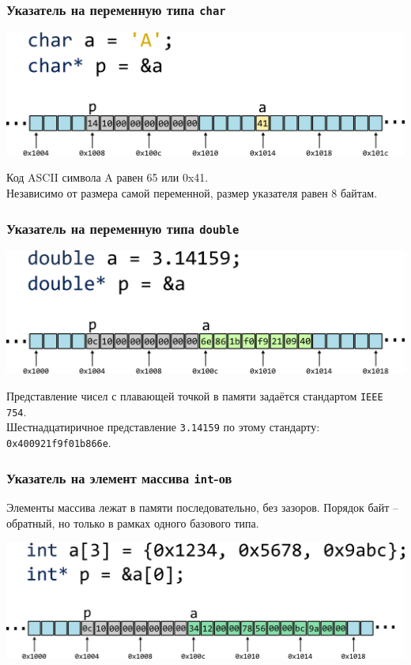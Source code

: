 \documentclass[10pt,pdf,hyperref={unicode}]{beamer}
\begin{document}
\begin{frame}[fragile]
\frametitle{Указатель на переменную типа \texttt{char}} 
\begin{center}
\includegraphics[width=0.86\linewidth]{../images/memory/memory_4_pointer_to_char.png}
\end{center}
Код ASCII символа A равен 65 или 0x41. \\
Независимо от размера самой переменной, размер указателя равен 8 байтам.
\end{frame}

\begin{frame}[fragile]
\frametitle{Указатель на переменную типа \texttt{double}} 
\begin{center}
\includegraphics[width=0.86\linewidth]{../images/memory/memory_5_pointer_to_double.png}
\end{center}
Представление чисел с плавающей точкой в памяти задаётся стандартом \texttt{IEEE 754}.\\
Шестнадцатиричное представление \texttt{3.14159} по этому стандарту: \texttt{0x400921f9f01b866e}.
\end{frame}

\begin{frame}[fragile]
\frametitle{Указатель на элемент массива \texttt{int}-ов} 
Элементы массива лежат в памяти последовательно, без зазоров. 
Порядок байт -- обратный, но только в рамках одного базового типа.
\begin{center}
\includegraphics[width=0.86\linewidth]{../images/memory/memory_6_pointer_to_int_array.png}
\end{center}
\end{frame}
\end{document}
